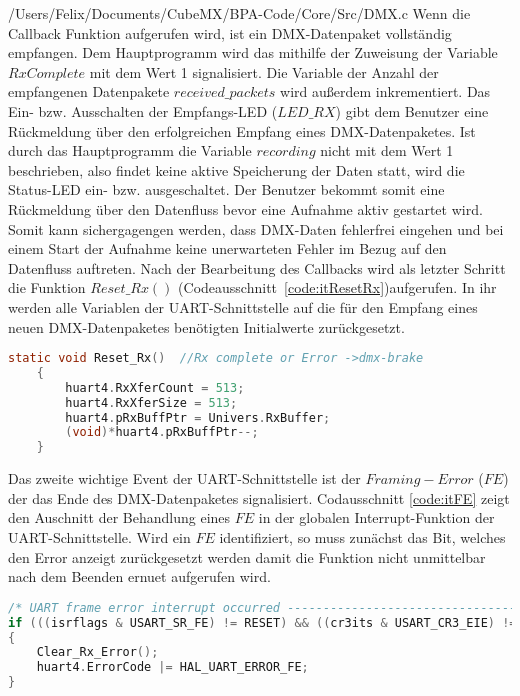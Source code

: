 
{/Users/Felix/Documents/CubeMX/BPA-Code/Core/Src/DMX.c}
Wenn die Callback Funktion aufgerufen wird, ist ein DMX-Datenpaket vollständig empfangen. Dem Hauptprogramm wird das mithilfe der Zuweisung der Variable $RxComplete$ mit dem Wert 1 signalisiert. Die Variable der Anzahl der empfangenen Datenpakete $received\_packets$ wird außerdem inkrementiert. Das Ein- bzw. Ausschalten der Empfangs-LED ($LED\_RX$) gibt dem Benutzer eine Rückmeldung über den erfolgreichen Empfang eines DMX-Datenpaketes. Ist durch das Hauptprogramm die Variable $recording$ nicht mit dem  Wert 1 beschrieben, also findet keine aktive Speicherung der Daten statt, wird die Status-LED ein- bzw. ausgeschaltet. Der Benutzer bekommt somit eine Rückmeldung über den Datenfluss bevor eine Aufnahme aktiv gestartet wird. Somit kann sichergagengen werden, dass DMX-Daten fehlerfrei eingehen und bei einem Start der Aufnahme keine unerwarteten Fehler im Bezug auf den Datenfluss auftreten.
\newline
Nach der Bearbeitung des Callbacks wird als letzter Schritt die Funktion $Reset\_Rx()$ (Codeausschnitt \,\ref{code:itResetRx})aufgerufen. In ihr werden alle Variablen der UART-Schnittstelle auf die für den Empfang eines neuen DMX-Datenpaketes benötigten Initialwerte zurückgesetzt.
\begin{lstlisting}[caption = stm32f4xx\_it.c: UART Reset\_Rx(),
	label = code:itResetRx, 
	language = C, 
	firstnumber = 434]
	static void Reset_Rx()	//Rx complete or Error ->dmx-brake
	{
		huart4.RxXferCount = 513;
		huart4.RxXferSize = 513;
		huart4.pRxBuffPtr = Univers.RxBuffer;
		(void)*huart4.pRxBuffPtr--;
	}
\end{lstlisting}
Das zweite wichtige Event der UART-Schnittstelle ist der $Framing-Error$ ($FE$) der das Ende des DMX-Datenpaketes signalisiert. Codausschnitt \ref{code:itFE} zeigt den Auschnitt der Behandlung eines $FE$ in der globalen Interrupt-Funktion der UART-Schnittstelle. Wird ein $FE$ identifiziert, so muss zunächst das Bit, welches den Error anzeigt zurückgesetzt werden damit die Funktion nicht unmittelbar nach dem Beenden ernuet aufgerufen wird.
\begin{lstlisting}[caption = stm32f4xx\_it.c: UART Framing Error,
	label = code:itFE, 
	language = C, 
	firstnumber = 349]
/* UART frame error interrupt occurred -----------------------------------*/
if (((isrflags & USART_SR_FE) != RESET) && ((cr3its & USART_CR3_EIE) != RESET))
{
	Clear_Rx_Error();
	huart4.ErrorCode |= HAL_UART_ERROR_FE;
}
\end{lstlisting}
